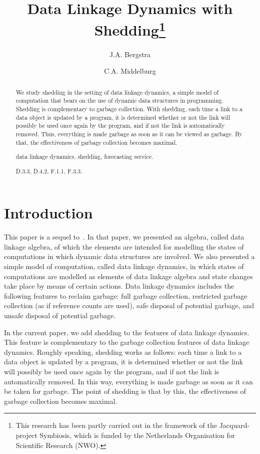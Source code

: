 \documentclass[fleqn]{llncs}
\title{Data Linkage Dynamics with Shedding\thanks{This research has been partly carried out in the
               framework of the Jacquard-project Symbiosis, which is
               funded by the Netherlands Organisation for Scientific
               Research (NWO).}}
\author{J.A. Bergstra \and C.A. Middelburg}
\institute{Informatics Institute, University of Amsterdam \\
           Science Park~107, 1098~XG Amsterdam, the Netherlands \\
           \email{J.A.Bergstra@uva.nl,C.A.Middelburg@uva.nl}}
\begin{document}
\maketitle

\begin{abstract}
We study shedding in the setting of data linkage dynamics, a simple
model of computation that bears on the use of dynamic data structures
in programming.
Shedding is complementary to garbage collection.
With shedding, each time a link to a data object is updated by a
program, it is determined whether or not the link will possibly be used
once again by the program, and if not the link is automatically removed.
Thus, everything is made garbage as soon as it can be viewed as garbage.
By that, the effectiveness of garbage collection becomes maximal.
\begin{keywords}
data linkage dynamics, shedding, forecasting service.
\end{keywords}
\begin{classcode}
D.3.3, D.4.2, F.1.1, F.3.3.
\end{classcode}
\end{abstract}

\section{Introduction}
\label{sect-intro}

This paper is a sequel to~\cite{BM08d}.
In that paper, we presented an algebra, called data linkage algebra, of
which the elements are intended for modelling the states of computations
in which dynamic data structures are involved.
We also presented a simple model of computation, called data linkage
dynamics, in which states of computations are modelled as elements of
data linkage algebra and state changes take place by means of certain
actions.
Data linkage dynamics includes the following features to reclaim
garbage: full garbage collection, restricted garbage collection (as if
reference counts are used), safe disposal of potential garbage, and
unsafe disposal of potential garbage.

In the current paper, we add shedding to the features of data linkage
dynamics.
This feature is complementary to the garbage collection features of data
linkage dynamics.
Roughly speaking, shedding works as follows: each time a link to a data
object is updated by a program, it is determined whether or not the link
will possibly be used once again by the program, and if not the link is
automatically removed.
In this way, everything is made garbage as soon as it can be taken for
garbage.
The point of shedding is that by this, the effectiveness of garbage
collection becomes maximal.
\end{document}
